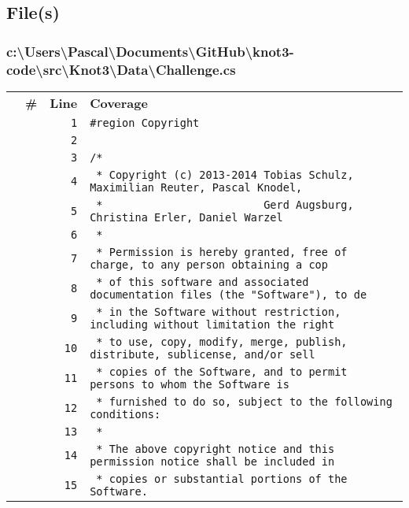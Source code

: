 \documentclass[a4paper,10pt]{article}
\begin{document}
\subsection{File(s)}
\subsubsection{c:\textbackslash Users\textbackslash Pascal\textbackslash Documents\textbackslash GitHub\textbackslash knot3-code\textbackslash src\textbackslash Knot3\textbackslash Data\textbackslash Challenge.cs}
\begin{longtable}[l]{lrrl}
\textbf{} & \textbf{\#} & \textbf{Line} & \textbf{Coverage}\\
\cellcolor{gray} &  & \verb~1~ & \verb~#region Copyright~\\
\cellcolor{gray} &  & \verb~2~ & \verb~~\\
\cellcolor{gray} &  & \verb~3~ & \verb~/*~\\
\cellcolor{gray} &  & \verb~4~ & \verb~ * Copyright (c) 2013-2014 Tobias Schulz, Maximilian Reuter, Pascal Knodel,~\\
\cellcolor{gray} &  & \verb~5~ & \verb~ *                         Gerd Augsburg, Christina Erler, Daniel Warzel~\\
\cellcolor{gray} &  & \verb~6~ & \verb~ *~\\
\cellcolor{gray} &  & \verb~7~ & \verb~ * Permission is hereby granted, free of charge, to any person obtaining a cop~\\
\cellcolor{gray} &  & \verb~8~ & \verb~ * of this software and associated documentation files (the "Software"), to de~\\
\cellcolor{gray} &  & \verb~9~ & \verb~ * in the Software without restriction, including without limitation the right~\\
\cellcolor{gray} &  & \verb~10~ & \verb~ * to use, copy, modify, merge, publish, distribute, sublicense, and/or sell~\\
\cellcolor{gray} &  & \verb~11~ & \verb~ * copies of the Software, and to permit persons to whom the Software is~\\
\cellcolor{gray} &  & \verb~12~ & \verb~ * furnished to do so, subject to the following conditions:~\\
\cellcolor{gray} &  & \verb~13~ & \verb~ *~\\
\cellcolor{gray} &  & \verb~14~ & \verb~ * The above copyright notice and this permission notice shall be included in ~\\
\cellcolor{gray} &  & \verb~15~ & \verb~ * copies or substantial portions of the Software.~\\

\end{longtable}
\end{document}
